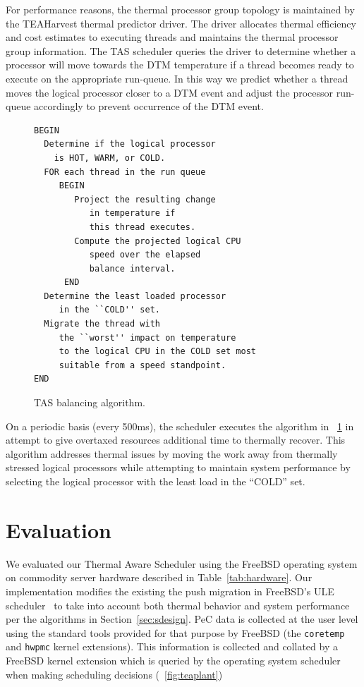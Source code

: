 \documentclass[times, 10pt,twocolumn]{IEEEtran}
\begin{document}
For performance reasons, the thermal processor group topology is
maintained by the TEAHarvest thermal predictor driver.  The driver
allocates thermal efficiency and cost estimates to executing threads and
maintains the thermal processor group information. The TAS scheduler
queries the driver to determine whether a processor will move towards
the DTM temperature if a thread becomes ready to execute on the
appropriate run-queue.  In this way we predict whether a thread moves
the logical processor closer to a DTM event and adjust the processor
run-queue accordingly to prevent occurrence of the DTM event.

\begin{figure}[t] \centering
\begin{verbatim} 
BEGIN 
  Determine if the logical processor 
    is HOT, WARM, or COLD.  
  FOR each thread in the run queue 
     BEGIN 
        Project the resulting change 
           in temperature if 
           this thread executes.  
        Compute the projected logical CPU 
           speed over the elapsed 
           balance interval.  
      END 
  Determine the least loaded processor 
     in the ``COLD'' set.  
  Migrate the thread with 
     the ``worst'' impact on temperature 
     to the logical CPU in the COLD set most
     suitable from a speed standpoint.  
END
\end{verbatim}
  \caption{TAS balancing algorithm.}
  \label{fig:tascode}
\end{figure} 
On a periodic basis (every 500ms), the scheduler executes
the algorithm in \figurename~\ref{fig:tascode} in attempt to give
overtaxed resources additional time to thermally recover.  This
algorithm addresses thermal issues by moving the work away from
thermally stressed logical processors while attempting to maintain
system performance by selecting the logical processor with the least
load in the ``COLD'' set.

\section{Evaluation}
\label{sec:experiment} We evaluated our Thermal Aware Scheduler using
the FreeBSD operating system on commodity server hardware described in
Table~\ref{tab:hardware}. Our implementation modifies the existing the
push migration in FreeBSD's ULE scheduler~\cite{Roberson2003} to take
into account both thermal behavior and system performance per the
algorithms in Section~\ref{sec:sdesign}. PeC data is collected at the
user level using the standard tools provided for that purpose by FreeBSD
(the \texttt{coretemp} and \texttt{hwpmc} kernel extensions).  This
information is collected and collated by a FreeBSD kernel extension
which is queried by the operating system scheduler when making
scheduling decisions (\figurename~\ref{fig:teaplant})
\end{document}

